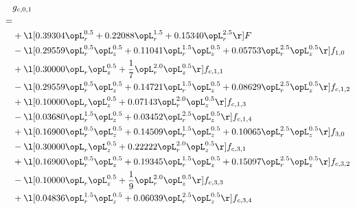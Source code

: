 \begin{alignat}{2} 
\label{eq:g_01_0} 
& g_{c,0,1} \nonumber \\ 
 = \\ 
& + \l[  0.39304 \opL_r^{0.5} +  0.22088 \opL_r^{1.5} +  0.15340 \opL_r^{2.5}  \r] F \nonumber \\ 
& - \l[  0.29559 \opL_r^{0.5} \opL_z^{0.5} +  0.11041 \opL_r^{1.5} \opL_z^{0.5} +  0.05753 \opL_r^{2.5} \opL_z^{0.5}  \r] f_{1,0} \nonumber \\ 
& + \l[  0.30000 \opL_r \opL_z^{0.5} + \frac{1}{7} \opL_r^{2.0} \opL_z^{0.5}  \r] f_{c,1,1} \nonumber \\ 
& - \l[  0.29559 \opL_r^{0.5} \opL_z^{0.5} +  0.14721 \opL_r^{1.5} \opL_z^{0.5} +  0.08629 \opL_r^{2.5} \opL_z^{0.5}  \r] f_{c,1,2} \nonumber \\ 
& + \l[  0.10000 \opL_r \opL_z^{0.5} +  0.07143 \opL_r^{2.0} \opL_z^{0.5}  \r] f_{c,1,3} \nonumber \\ 
& - \l[  0.03680 \opL_r^{1.5} \opL_z^{0.5} +  0.03452 \opL_r^{2.5} \opL_z^{0.5}  \r] f_{c,1,4} \nonumber \\ 
& + \l[  0.16900 \opL_r^{0.5} \opL_z^{0.5} +  0.14509 \opL_r^{1.5} \opL_z^{0.5} +  0.10065 \opL_r^{2.5} \opL_z^{0.5}  \r] f_{3,0} \nonumber \\ 
& - \l[  0.30000 \opL_r \opL_z^{0.5} +  0.22222 \opL_r^{2.0} \opL_z^{0.5}  \r] f_{c,3,1} \nonumber \\ 
& + \l[  0.16900 \opL_r^{0.5} \opL_z^{0.5} +  0.19345 \opL_r^{1.5} \opL_z^{0.5} +  0.15097 \opL_r^{2.5} \opL_z^{0.5}  \r] f_{c,3,2} \nonumber \\ 
& - \l[  0.10000 \opL_r \opL_z^{0.5} + \frac{1}{9} \opL_r^{2.0} \opL_z^{0.5}  \r] f_{c,3,3} \nonumber \\ 
& + \l[  0.04836 \opL_r^{1.5} \opL_z^{0.5} +  0.06039 \opL_r^{2.5} \opL_z^{0.5}  \r] f_{c,3,4} \nonumber \\ 
\end{alignat} 


